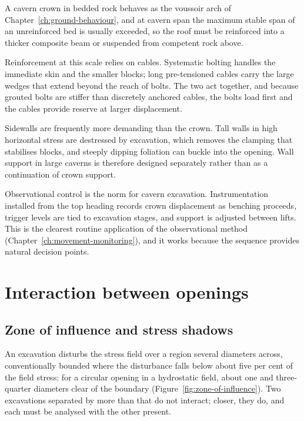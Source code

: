 A cavern crown in bedded rock behaves as the voussoir arch of
Chapter~\ref{ch:ground-behaviour}, and at cavern span the maximum stable span
of an unreinforced bed is usually exceeded, so the roof must be reinforced
into a thicker composite beam or suspended from competent rock above.

Reinforcement at this scale relies on cables. Systematic bolting handles the
immediate skin and the smaller blocks; long pre-tensioned cables carry the
large wedges that extend beyond the reach of bolts. The two act together, and because
grouted bolts are stiffer than discretely anchored cables, the bolts load
first and the cables provide reserve at larger displacement.

Sidewalls are frequently more demanding than the crown. Tall walls in high
horizontal stress are destressed by excavation, which removes the clamping
that stabilises blocks, and steeply dipping foliation can buckle into the
opening. Wall support in large caverns is therefore designed separately
rather than as a continuation of crown support.

Observational control is the norm for cavern excavation. Instrumentation
installed from the top heading records crown displacement as benching
proceeds, trigger levels are tied to excavation stages, and support is
adjusted between lifts. This is the clearest routine application of the
observational method (Chapter~\ref{ch:movement-monitoring}), and it works because the sequence provides natural
decision points.

\section{Interaction between openings}
\label{sec:interaction}

\subsection{Zone of influence and stress shadows}
\label{sec:zone-influence-shadows}

An excavation disturbs the stress field over a region several diameters
across, conventionally bounded where the disturbance falls below about five
per cent of the field stress: for a circular opening in a hydrostatic
field, about one and three-quarter diameters clear of the boundary (Figure~\ref{fig:zone-of-influence}). Two excavations separated by more than that
do not interact; closer, they do, and each must be analysed with the other
present.

